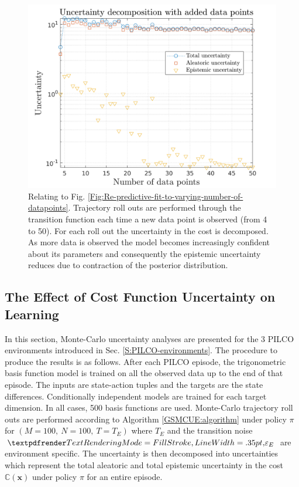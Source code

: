 \begin{figure}[htp!]
\centering    
\includegraphics[width=1\textwidth]{Chapter3/Figures/func_uncertainty_4.png}
\caption[Uncertainty decomposition showing reduction in epistemic uncertainty with increasing number of data points]{Relating to Fig. \ref{Fig:Re-predictive-fit-to-varying-number-of-datapoints}. Trajectory roll outs are performed through the transition function each time a new data point is observed (from 4 to 50). For each roll out the uncertainty in the cost is decomposed. As more data is observed the model becomes increasingly confident about its parameters and consequently the epistemic uncertainty reduces due to contraction of the posterior distribution.}
\label{Fig:Re-reduction-in-epsitemic-with-more-data}
\end{figure}


\subsection{The Effect of Cost Function Uncertainty on Learning}
\label{S:Re-PILCO-envs}
In this section, Monte-Carlo uncertainty analyses  are presented for the 3 PILCO environments introduced in Sec. \ref{S:PILCO-environments}. The procedure to produce the results is as follows. After each PILCO episode, the trigonometric basis function model is trained on all the observed data up to the end of that episode. The inputs are state-action tuples and the targets are the state differences. Conditionally independent models are trained for each target dimension. In all cases, 500 basis functions are used. Monte-Carlo trajectory roll outs are performed according to Algorithm \ref{GSMCUE:algorithm} under policy $\pi$ for $(M=100,\:N=100,\:T=T_{E})$ where $T_{E}$ and the transition noise $\boldgreek{\varepsilon}_{E}$ are environment specific. The uncertainty is then decomposed into uncertainties which represent the total aleatoric and total epistemic uncertainty in the cost $\mathbb{C}(\mathbf{x})$ under policy $\pi$ for an entire episode.   

